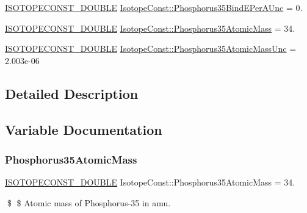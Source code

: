 \begin{DoxyCompactItemize}
\mbox{\hyperlink{group___isotope_const-_macros_ga8f45a7272ce02c0b4c65c44636ed719a}{I\+S\+O\+T\+O\+P\+E\+C\+O\+N\+S\+T\+\_\+\+D\+O\+U\+B\+LE}} \mbox{\hyperlink{group___isotope_const-_phosphorus-_p35_gad5852169539155fa43642e543f036418}{Isotope\+Const\+::\+Phosphorus35\+Bind\+E\+Per\+A\+Unc}} = 0.
\item 
\mbox{\hyperlink{group___isotope_const-_macros_ga8f45a7272ce02c0b4c65c44636ed719a}{I\+S\+O\+T\+O\+P\+E\+C\+O\+N\+S\+T\+\_\+\+D\+O\+U\+B\+LE}} \mbox{\hyperlink{group___isotope_const-_phosphorus-_p35_ga0412659971dcb00d1313cd11ecc119ec}{Isotope\+Const\+::\+Phosphorus35\+Atomic\+Mass}} = 34.
\item 
\mbox{\hyperlink{group___isotope_const-_macros_ga8f45a7272ce02c0b4c65c44636ed719a}{I\+S\+O\+T\+O\+P\+E\+C\+O\+N\+S\+T\+\_\+\+D\+O\+U\+B\+LE}} \mbox{\hyperlink{group___isotope_const-_phosphorus-_p35_ga22609f289c5e959933a756fee405195f}{Isotope\+Const\+::\+Phosphorus35\+Atomic\+Mass\+Unc}} = 2.\+003e-\/06
\end{DoxyCompactItemize}


\subsection{Detailed Description}


\subsection{Variable Documentation}
\mbox{\label{group___isotope_const-_phosphorus-_p35_ga0412659971dcb00d1313cd11ecc119ec}} 
\subsubsection{\texorpdfstring{Phosphorus35\+Atomic\+Mass}{Phosphorus35AtomicMass}}
{\footnotesize\ttfamily \mbox{\hyperlink{group___isotope_const-_macros_ga8f45a7272ce02c0b4c65c44636ed719a}{I\+S\+O\+T\+O\+P\+E\+C\+O\+N\+S\+T\+\_\+\+D\+O\+U\+B\+LE}} Isotope\+Const\+::\+Phosphorus35\+Atomic\+Mass = 34.}

\$ \$ Atomic mass of Phosphorus-\/35 in amu. \mbox{\label{group___isotope_const-_phosphorus-_p35_ga22609f289c5e959933a756fee405195f}} 
